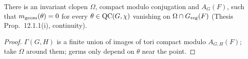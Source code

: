 \begin{proposition}
\label{exists_qcCutoff_mGeom}
\leanok
{}
There is an invariant clopen $\Omega$, compact modulo conjugation and $A_G(F)$, such that $m_{\mathrm{geom}}(\theta)=0$ for
every $\theta\in\mathrm{QC}(G,\chi)$ vanishing on $\Omega\cap G_{\mathrm{reg}}(F)$ (Thesis Prop.~12.1.1(i), continuity).
\end{proposition}
\begin{proof}
\leanok
{}
$\Gamma(G,H)$ is a finite union of images of tori compact modulo $A_{G,H}(F)$; take $\Omega$ around them; germs only depend on $\theta$ near the point.
\end{proof}


